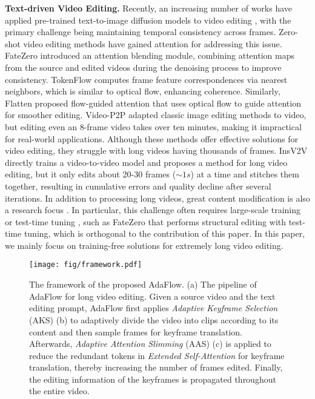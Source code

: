 \textbf{Text-driven Video Editing.} Recently, an increasing number of works have applied pre-trained text-to-image diffusion models to video editing \cite{wang2023zero, wu2023tune, cohen2024slicedit, ma2024follow, liu2024video}, with the primary challenge being maintaining temporal consistency across frames. Zero-shot video editing methods have gained attention for addressing this issue. 
FateZero \cite{qi2023fatezero} introduced an attention blending module, combining attention maps from the source and edited videos during the denoising process to improve consistency. 
TokenFlow \cite{geyer2023tokenflow} computes frame feature correspondences via nearest neighbors, which is similar to optical flow, enhancing coherence. 
Similarly, Flatten \cite{cong2023flatten} proposed flow-guided attention that uses optical flow to guide attention for smoother editing. 
Video-P2P \cite{liu2024video} adapted classic image editing methods to video, but editing even an 8-frame video takes over ten minutes, making it impractical for real-world applications. Although these methods offer effective solutions for video editing, they struggle with long videos having thousands of frames.
InsV2V \cite{cheng2023consistent} directly trains a video-to-video model and proposes a method for long video editing, but it only edits about 20-30 frames ($\sim1s$) at a time and stitches them together, resulting in cumulative errors and quality decline after several iterations. In addition to processing long videos, great content modification is also a research focus \cite{cong2023flatten, geyer2023tokenflow}. In particular, this challenge often requires large-scale training or test-time tuning \cite{wu2023tune, qi2023fatezero, gu2024videoswap}, such as FateZero \cite{qi2023fatezero} that performs structural editing with test-time tuning, which is orthogonal to the contribution of this paper. In this paper, we mainly focus on training-free solutions for extremely long video editing.

\begin{figure*}[ht]
\vskip 0.1in
\begin{center}
\centerline{\texttt{[image: fig/framework.pdf]}}
\vskip -0.1in
\caption{The framework of the proposed AdaFlow. (a) The pipeline of AdaFlow for long video editing. Given a source video and the text editing prompt, AdaFlow first applies \emph{Adaptive Keyframe Selection} (AKS) (b) to adaptively divide the video into clips according to its content and then sample frames for keyframe translation. Afterwards, \emph{Adaptive Attention Slimming} (AAS) (c) is applied to reduce the redundant tokens in \emph{Extended Self-Attention} for keyframe translation, thereby increasing the number of frames edited. Finally, the editing information of the keyframes is propagated throughout the entire video.}
\label{fig:framework}
\end{center}
\vskip -0.3in
\end{figure*}